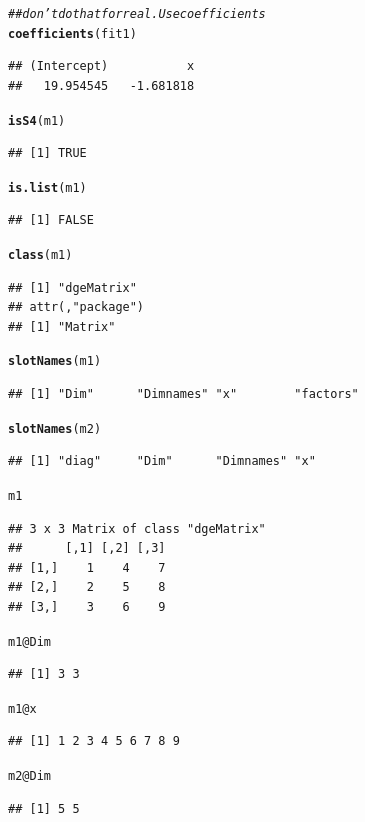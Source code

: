 \documentclass{config/apuntes}\usepackage[]{graphicx}\usepackage[]{xcolor}
\makeatletter
\newcommand{\hlcom}[1]{\textcolor[rgb]{0.678,0.584,0.686}{\textit{#1}}}%
\newcommand{\hlopt}[1]{\textcolor[rgb]{0,0,0}{#1}}%
\newcommand{\hldef}[1]{\textcolor[rgb]{0.345,0.345,0.345}{#1}}%
\newcommand{\hlkwc}[1]{\textcolor[rgb]{0.333,0.667,0.333}{#1}}%
\newcommand{\hlkwd}[1]{\textcolor[rgb]{0.737,0.353,0.396}{\textbf{#1}}}%
\newenvironment{kframe}{%
 \def\at@end@of@kframe{}%
 \ifinner\ifhmode%
  \def\at@end@of@kframe{\end{minipage}}%
  \begin{minipage}{\columnwidth}%
 \fi\fi%
 \def\FrameCommand##1{\hskip\@totalleftmargin \hskip-\fboxsep
 \colorbox{shadecolor}{##1}\hskip-\fboxsep
     \hskip-\linewidth \hskip-\@totalleftmargin \hskip\columnwidth}%
 \MakeFramed {\advance\hsize-\width
   \@totalleftmargin\z@ \linewidth\hsize
   \@setminipage}}%
 {\par\unskip\endMakeFramed%
 \at@end@of@kframe}
\newenvironment{knitrout}{}{} %
\makeatother
\begin{document}
\begin{knitrout}
\begin{kframe}
\begin{alltt}
\hlcom{## don't do that for real. Use coefficients}
\hlkwd{coefficients}\hldef{(fit1)}
\end{alltt}
\begin{verbatim}
## (Intercept)           x 
##   19.954545   -1.681818
\end{verbatim}
\begin{alltt}
\hlkwd{isS4}\hldef{(m1)}
\end{alltt}
\begin{verbatim}
## [1] TRUE
\end{verbatim}
\begin{alltt}
\hlkwd{is.list}\hldef{(m1)}
\end{alltt}
\begin{verbatim}
## [1] FALSE
\end{verbatim}
\begin{alltt}
\hlkwd{class}\hldef{(m1)}
\end{alltt}
\begin{verbatim}
## [1] "dgeMatrix"
## attr(,"package")
## [1] "Matrix"
\end{verbatim}
\begin{alltt}
\hlkwd{slotNames}\hldef{(m1)}
\end{alltt}
\begin{verbatim}
## [1] "Dim"      "Dimnames" "x"        "factors"
\end{verbatim}
\begin{alltt}
\hlkwd{slotNames}\hldef{(m2)}
\end{alltt}
\begin{verbatim}
## [1] "diag"     "Dim"      "Dimnames" "x"
\end{verbatim}
\begin{alltt}
\hldef{m1}
\end{alltt}
\begin{verbatim}
## 3 x 3 Matrix of class "dgeMatrix"
##      [,1] [,2] [,3]
## [1,]    1    4    7
## [2,]    2    5    8
## [3,]    3    6    9
\end{verbatim}
\begin{alltt}
\hldef{m1}\hlopt{@}\hlkwc{Dim}
\end{alltt}
\begin{verbatim}
## [1] 3 3
\end{verbatim}
\begin{alltt}
\hldef{m1}\hlopt{@}\hlkwc{x}
\end{alltt}
\begin{verbatim}
## [1] 1 2 3 4 5 6 7 8 9
\end{verbatim}
\begin{alltt}
\hldef{m2}\hlopt{@}\hlkwc{Dim}
\end{alltt}
\begin{verbatim}
## [1] 5 5
\end{verbatim}
\end{kframe}
\end{knitrout}
\end{document}
